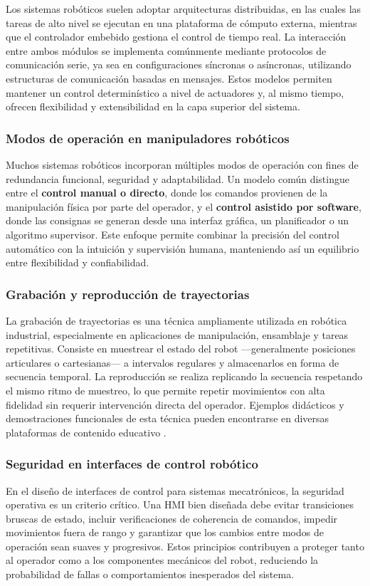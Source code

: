 Los sistemas robóticos suelen adoptar arquitecturas distribuidas, en las cuales las tareas de alto nivel se ejecutan en una plataforma de cómputo externa, mientras que el controlador embebido gestiona el control de tiempo real. La interacción entre ambos módulos se implementa comúnmente mediante protocolos de comunicación serie, ya sea en configuraciones síncronas o asíncronas, utilizando estructuras de comunicación basadas en mensajes. Estos modelos permiten mantener un control determinístico a nivel de actuadores y, al mismo tiempo, ofrecen flexibilidad y extensibilidad en la capa superior del sistema.

\subsubsection{Modos de operación en manipuladores robóticos}

Muchos sistemas robóticos incorporan múltiples modos de operación con fines de redundancia funcional, seguridad y adaptabilidad. Un modelo común distingue entre el \textbf{control manual o directo}, donde los comandos provienen de la manipulación física por parte del operador, y el \textbf{control asistido por software}, donde las consignas se generan desde una interfaz gráfica, un planificador o un algoritmo supervisor. Este enfoque permite combinar la precisión del control automático con la intuición y supervisión humana, manteniendo así un equilibrio entre flexibilidad y confiabilidad.

\subsubsection{Grabación y reproducción de trayectorias}

La grabación de trayectorias es una técnica ampliamente utilizada en robótica industrial, especialmente en aplicaciones de manipulación, ensamblaje y tareas repetitivas. Consiste en muestrear el estado del robot —generalmente posiciones articulares o cartesianas— a intervalos regulares y almacenarlos en forma de secuencia temporal. La reproducción se realiza replicando la secuencia respetando el mismo ritmo de muestreo, lo que permite repetir movimientos con alta fidelidad sin requerir intervención directa del operador. Ejemplos didácticos y demostraciones funcionales de esta técnica pueden encontrarse en diversas plataformas de contenido educativo \cite{youtube_robot_arm_mirror}.

\subsubsection{Seguridad en interfaces de control robótico}

En el diseño de interfaces de control para sistemas mecatrónicos, la seguridad operativa es un criterio crítico. Una HMI bien diseñada debe evitar transiciones bruscas de estado, incluir verificaciones de coherencia de comandos, impedir movimientos fuera de rango y garantizar que los cambios entre modos de operación sean suaves y progresivos. Estos principios contribuyen a proteger tanto al operador como a los componentes mecánicos del robot, reduciendo la probabilidad de fallas o comportamientos inesperados del sistema.

